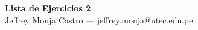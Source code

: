 \begin{center}
    {\Large \textbf{Lista de Ejercicios 2}} \\[0.2cm]
    Jeffrey Monja Castro --- jeffrey.monja@utec.edu.pe \\[0.2cm]
\end{center}